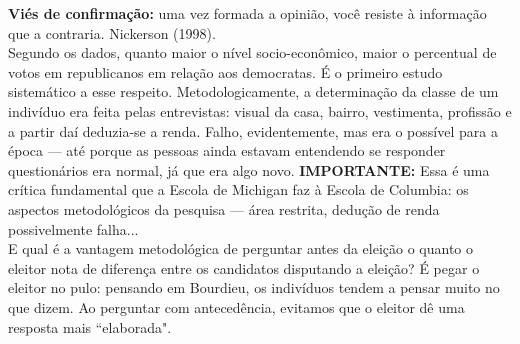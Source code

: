 \noindent \textbf{Viés de confirmação:} uma vez formada a opinião, você resiste à informação que a contraria. Nickerson (1998). \\

\noindent Segundo os dados, quanto maior o nível socio-econômico, maior o percentual de votos em republicanos em relação aos democratas. É o primeiro estudo sistemático a esse respeito. Metodologicamente, a determinação da classe de um indivíduo era feita pelas entrevistas: visual da casa, bairro, vestimenta, profissão e a partir daí deduzia-se a renda. Falho, evidentemente, mas era o possível para a época --- até porque as pessoas ainda estavam entendendo se responder questionários era normal, já que era algo novo. \textbf{IMPORTANTE: }Essa é uma crítica fundamental que a Escola de Michigan faz à Escola de Columbia: os aspectos metodológicos da pesquisa --- área restrita, dedução de renda possivelmente falha... \\

\noindent E qual é a vantagem metodológica de perguntar antes da eleição o quanto o eleitor nota de diferença entre os candidatos disputando a eleição? É pegar o eleitor no pulo: pensando em Bourdieu, os indivíduos tendem a pensar muito no que dizem. Ao perguntar com antecedência, evitamos que o eleitor dê uma resposta mais ``elaborada".